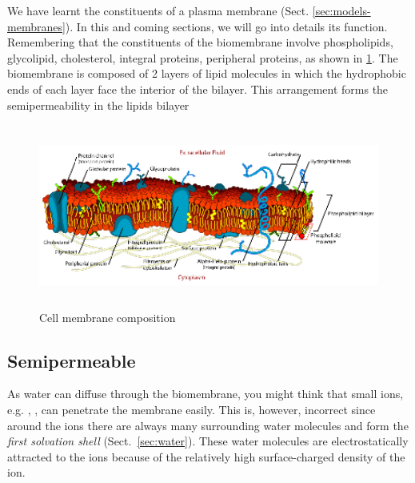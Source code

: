 We have learnt the constituents of a plasma membrane
(Sect. \ref{sec:models-membranes}). In this and coming sections, we
will go into details its function.  Remembering that the constituents
of the biomembrane involve phospholipids, glycolipid, cholesterol,
integral proteins, peripheral proteins, as shown in
\ref{fig:membrane-full}.  The biomembrane is composed of 2 layers of
lipid molecules in which the hydrophobic ends of each layer face the
interior of the bilayer. This arrangement forms the semipermeability
in the lipids bilayer

\begin{figure}[htb]
  \centerline{\includegraphics[height=6cm]{./images/Cell_membrane.eps}}
  \caption{Cell membrane composition}\label{fig:membrane-full}
\end{figure}


\subsection{Semipermeable}
\label{sec:semipermeable}


As water can diffuse through the biomembrane, you might think that
small ions, e.g. , ,  can penetrate the
membrane easily. This is, however, incorrect since around the ions
there are always many surrounding water molecules and form the
{\it first solvation shell} (Sect.~\ref{sec:water}).  These water
molecules are electrostatically attracted to the ions because of the
relatively high surface-charged density of the ion. 

